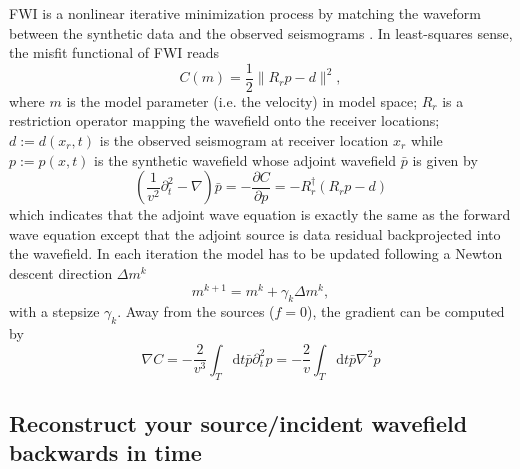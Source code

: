 FWI is a nonlinear iterative minimization process by matching the waveform between the synthetic data and the observed seismograms \citep{Tarantola_1984_ISR,Virieux_2009_OFW}. In least-squares sense, the misfit functional of FWI reads
\begin{equation}\label{misfit}
 C(m)=\frac{1}{2}\| R_r p -d\|^2,
\end{equation}
where $m$ is the model parameter (i.e. the velocity) in model space; $R_r$ is a restriction operator mapping the wavefield onto the receiver locations; $d:=d(x_r,t)$ is the observed seismogram  at receiver location $x_r$ while $p:=p(x,t)$ is the synthetic wavefield whose adjoint wavefield $\bar{p}$ is given by
\begin{equation}\label{adjeq}
(\frac{1}{v^2}\partial_t^2 - \nabla) \bar{p}=-\frac{\partial C}{\partial p}=-R_r^\dagger (R_r p-d)
\end{equation}
which indicates that the adjoint wave equation is exactly the same as the forward wave equation except that the adjoint source is data residual backprojected into the wavefield.
In each iteration the model has to be updated following a Newton descent direction $\Delta m^k$
\begin{equation}
 m^{k+1}=m^k+\gamma_k \Delta m^k,
\end{equation}
with a stepsize $\gamma_k$. Away from the sources ($f=0$), the gradient can be computed by
\begin{equation} \label{gradient}
 \nabla C=-\frac{2}{v^3}\int_T\mathrm{d}t\bar{p} \partial_t^2 p=-\frac{2}{v}\int_T\mathrm{d}t\bar{p} \nabla^2 p
\end{equation}


\subsection{Reconstruct your source/incident wavefield backwards in time}

